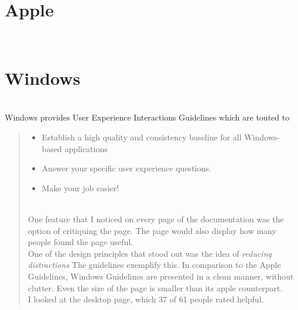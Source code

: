 \documentclass[12pt, oneside, letterpaper]{report}
\begin{document}
\section*{Apple} ~\\


\section*{Windows} ~\\
Windows provides User Experience Interactions Guidelines which are touted to 
\begin{quote}
\begin{itemize}
\item Establish a high quality and consistency baseline for all Windows-based applications
\item Answer your specific user experience questions.
\item Make your job easier!
\end{itemize}
~\\
One feature that I noticed on every page of the documentation was the option of critiquing the page.  The page would also display how many people found the page useful.  \\
One of the design principles that stood out was the idea of \textit{reducing distractions} The guidelines exemplify this. In comparison to the Apple Guidelines, Windows Guidelines are presented in a clean manner, without clutter. Even the size of the page is smaller than its apple counterpart. \\
I looked at the desktop page, which 37 of 61 people rated helpful.  



\end{quote}
\end{document}

